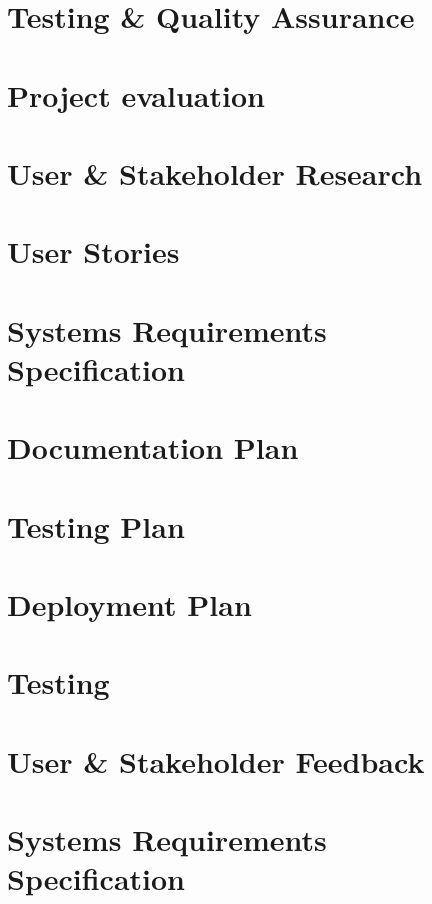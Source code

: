 \documentclass[12pt]{report}
\newcommand\blankpage{%
    \null
    \thispagestyle{empty}%
    \addtocounter{page}{-1}%
    \newpage}
\begin{document}
\chapter{Testing \& Quality Assurance}


\chapter{Project evaluation}


\afterpage{\blankpage}

\begin{appendices}

\chapter{User \& Stakeholder Research}


\chapter{User Stories}


\chapter{Systems Requirements Specification}


\chapter{Documentation Plan}


\chapter{Testing Plan}


\chapter{Deployment Plan}


\chapter{Testing}


\chapter{User \& Stakeholder Feedback}


\chapter{Systems Requirements Specification}

\end{appendices}

\printbibliography

\afterpage{\blankpage}
\end{document}
